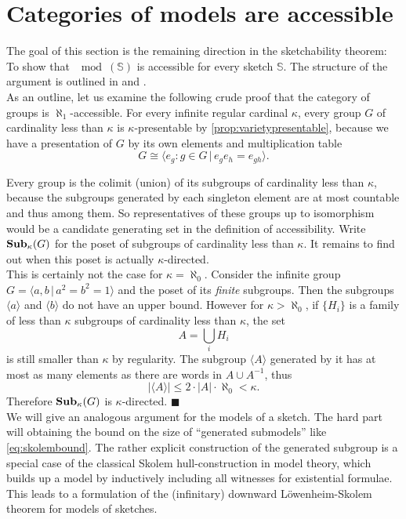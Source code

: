 \section{Categories of models are accessible}
\label{sec:sketchesaccessible}

The goal of this section is the remaining direction in the sketchability theorem: To show that $\mod(\mathbb S)$ is accessible for every sketch $\mathbb S$. The structure of the argument is outlined in \cite[\nopp~3.3.5]{MakkaiPare} and \cite[D2.3.11]{elephant}. \\

As an outline, let us examine the following crude proof that the category of groups is $\aleph_1$-accessible. For every infinite regular cardinal $\kappa$, every group $G$ of cardinality less than $\kappa$ is $\kappa$-presentable by \ref{prop:varietypresentable}, because we have a presentation of $G$ by its own elements and multiplication table
\[ G \cong \langle e_g : g \in G \,|\, e_g e_h = e_{gh} \rangle. \]

Every group is the colimit (union) of its subgroups of cardinality less than $\kappa$, because the subgroups generated by each singleton element are at most countable and thus among them. So representatives of these groups up to isomorphism would be a candidate generating set in the definition of accessibility. Write $\mathbf{Sub}_\kappa(G)$ for the poset of subgroups of cardinality less than $\kappa$. It remains to find out when this poset is actually $\kappa$-directed. \\

This is certainly not the case for $\kappa=\aleph_0$. Consider the infinite group $G=\langle a, b \,|\, a^2 = b^2 = 1 \rangle$ and the poset of its \emph{finite} subgroups. Then the subgroups $\langle a \rangle$ and $\langle b \rangle$ do not have an upper bound. 
However for $\kappa > \aleph_0$, if $\{H_i\}$ is a family of less than $\kappa$ subgroups of cardinality less than $\kappa$, the set \[ A = \bigcup_i H_i \]
is still smaller than $\kappa$ by regularity. The subgroup $\langle A \rangle$ generated by it has at most as many elements as there are words in $A \cup A^{-1}$, thus
\begin{equation} |\langle A \rangle| \leq 2 \cdot |A|\cdot \aleph_0 < \kappa. \label{eq:skolembound} \end{equation}
Therefore $\mathbf{Sub}_\kappa(G)$ is $\kappa$-directed. $\blacksquare$ \\

We will give an analogous argument for the models of a sketch. The hard part will obtaining the bound on the size of ``generated submodels'' like \eqref{eq:skolembound}. The rather explicit construction of the generated subgroup is a special case of the classical Skolem hull-construction in model theory, which builds up a model by inductively including all witnesses for existential formulae. This leads to a formulation of the (infinitary) downward Löwenheim-Skolem theorem for models of sketches. \\

